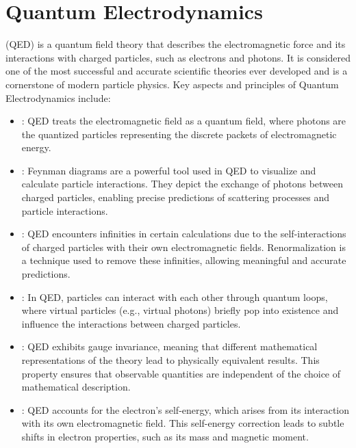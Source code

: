 \chapter{Quantum Electrodynamics}
\thispagestyle{fancy}

 (QED) is a quantum field theory that describes the electromagnetic force and its interactions with charged particles, such as electrons and photons. It is considered one of the most successful and accurate scientific theories ever developed and is a cornerstone of modern particle physics. Key aspects and principles of Quantum Electrodynamics include:

\begin{itemize}
	\item {}: QED treats the electromagnetic field as a quantum field, where photons are the quantized particles representing the discrete packets of electromagnetic energy.

	\item {}: Feynman diagrams are a powerful tool used in QED to visualize and calculate particle interactions. They depict the exchange of photons between charged particles, enabling precise predictions of scattering processes and particle interactions.

	\item {}: QED encounters infinities in certain calculations due to the self-interactions of charged particles with their own electromagnetic fields. Renormalization is a technique used to remove these infinities, allowing meaningful and accurate predictions.

	\item {}: In QED, particles can interact with each other through quantum loops, where virtual particles (e.g., virtual photons) briefly pop into existence and influence the interactions between charged particles.

	\item {}: QED exhibits gauge invariance, meaning that different mathematical representations of the theory lead to physically equivalent results. This property ensures that observable quantities are independent of the choice of mathematical description.

	\item {}: QED accounts for the electron's self-energy, which arises from its interaction with its own electromagnetic field. This self-energy correction leads to subtle shifts in electron properties, such as its mass and magnetic moment.
\end{itemize}

